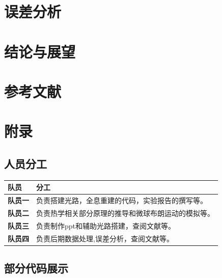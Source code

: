\documentclass[a4paper,draft]{report}
\begin{document}
\chapter{误差分析}

\chapter{结论与展望}

\chapter{参考文献}


\chapter{附录}
\section{人员分工}
\renewcommand{\arraystretch}{1.3} %
\begin{tabularx}{\textwidth}{>{\bfseries}l X}
\toprule
队员 & 分工 \\
\midrule
队员一 & 负责搭建光路，全息重建的代码，实验报告的撰写等。 \\
队员二 & 负责热学相关部分原理的推导和微球布朗运动的模拟等。 \\
队员三 & 负责制作ppt和辅助光路搭建，查阅文献等。 \\
队员四 & 负责后期数据处理,误差分析，查阅文献等。 \\
\bottomrule
\end{tabularx}

\section{部分代码展示}
\end{document}
